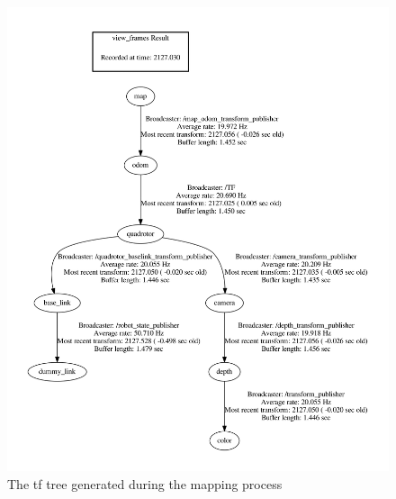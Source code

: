 \documentclass[a4paper,12pt,oneside]{book}
\begin{document}
\begin{figure}[h]
	\centering
	\includegraphics[scale=0.15]{tftree}
	\caption{The tf tree generated during the mapping process}
\end{figure}
\end{document}
